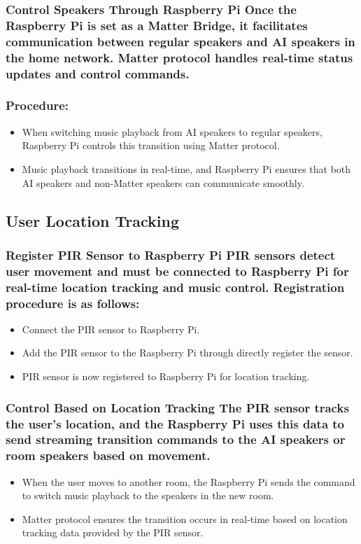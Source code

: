 \documentclass[conference]{IEEEtran}
\begin{document}
\subsubsection{Control Speakers Through Raspberry Pi Once the Raspberry Pi is set as a Matter Bridge, it facilitates communication between regular speakers and AI speakers in the home network. Matter protocol handles real-time status updates and control commands.\\\\Procedure:}
\begin{itemize}
    \item When switching music playback from AI speakers to regular speakers, Raspberry Pi controls this transition using Matter protocol.\\
    \item Music playback transitions in real-time, and Raspberry Pi ensures that both AI speakers and non-Matter speakers can communicate smoothly.\\
\end{itemize}


\subsection{User Location Tracking}

\subsubsection{Register PIR Sensor to Raspberry Pi PIR sensors detect user movement and must be connected to Raspberry Pi for real-time location tracking and music control.
Registration procedure is as follows:}
\begin{itemize}
    \item Connect the PIR sensor to Raspberry Pi.\\
    \item Add the PIR sensor to the Raspberry Pi through  directly register the sensor.\\
    \item PIR sensor is now registered to Raspberry Pi for location tracking.\\
\end{itemize}


\subsubsection{Control Based on Location Tracking The PIR sensor tracks the user’s location, and the Raspberry Pi uses this data to send streaming transition commands to the AI speakers or room speakers based on movement.}
\begin{itemize}
    \item When the user moves to another room, the Raspberry Pi sends the command to switch music playback to the speakers in the new room.\\
    \item Matter protocol ensures the transition occurs in real-time based on location tracking data provided by the PIR sensor.\\
\end{itemize}
\end{document}
